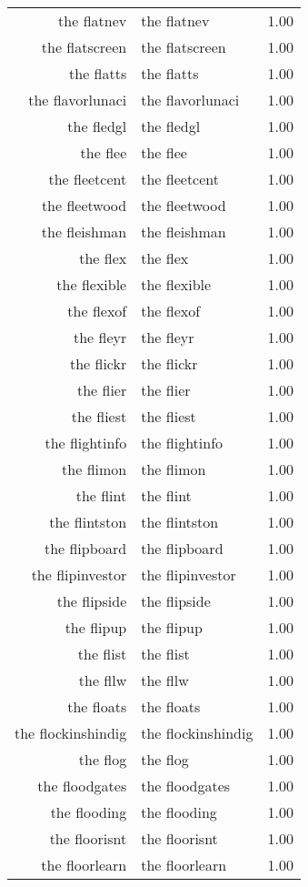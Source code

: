 \begin{table}[ht]
\begin{tabular}{rlr}
  the flatnev & the flatnev & 1.00 \\ 
  the flatscreen & the flatscreen & 1.00 \\ 
  the flatts & the flatts & 1.00 \\ 
  the flavorlunaci & the flavorlunaci & 1.00 \\ 
  the fledgl & the fledgl & 1.00 \\ 
  the flee & the flee & 1.00 \\ 
  the fleetcent & the fleetcent & 1.00 \\ 
  the fleetwood & the fleetwood & 1.00 \\ 
  the fleishman & the fleishman & 1.00 \\ 
  the flex & the flex & 1.00 \\ 
  the flexible & the flexible & 1.00 \\ 
  the flexof & the flexof & 1.00 \\ 
  the fleyr & the fleyr & 1.00 \\ 
  the flickr & the flickr & 1.00 \\ 
  the flier & the flier & 1.00 \\ 
  the fliest & the fliest & 1.00 \\ 
  the flightinfo & the flightinfo & 1.00 \\ 
  the flimon & the flimon & 1.00 \\ 
  the flint & the flint & 1.00 \\ 
  the flintston & the flintston & 1.00 \\ 
  the flipboard & the flipboard & 1.00 \\ 
  the flipinvestor & the flipinvestor & 1.00 \\ 
  the flipside & the flipside & 1.00 \\ 
  the flipup & the flipup & 1.00 \\ 
  the flist & the flist & 1.00 \\ 
  the fllw & the fllw & 1.00 \\ 
  the floats & the floats & 1.00 \\ 
  the flockinshindig & the flockinshindig & 1.00 \\ 
  the flog & the flog & 1.00 \\ 
  the floodgates & the floodgates & 1.00 \\ 
  the flooding & the flooding & 1.00 \\ 
  the floorisnt & the floorisnt & 1.00 \\ 
  the floorlearn & the floorlearn & 1.00 \\ 

\end{tabular}
\end{table}
